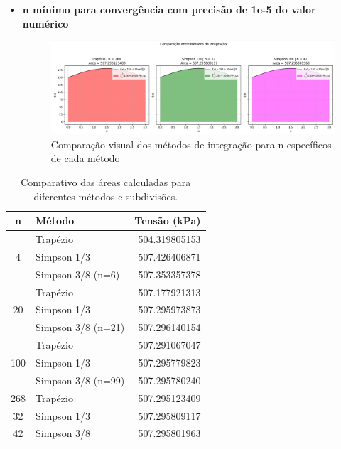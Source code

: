 \documentclass{article}
\begin{document}
\begin{itemize}
    \item \textbf{n mínimo para convergência com precisão de 1e-5 do valor numérico}
    \begin{figure}[H]
        \centering
        \includegraphics[width=1\textwidth, height=0.3\textheight, keepaspectratio]{n_min.png}
        \caption{Comparação visual dos métodos de integração para n específicos de cada método}\label{fig:n_min}
    \end{figure}
\end{itemize}

\begin{table}[htbp]
    \centering
    \caption{Comparativo das áreas calculadas para diferentes métodos e subdivisões.}\label{tab:resultados_agrupados}
    \begin{tabular}{c l r}
        \toprule
        \textbf{n} & \textbf{Método} & \textbf{ Tensão (kPa) } \\
        \midrule
        \multirow{3}{*}{4} 
        & Trapézio & 504.319805153 \\
        & Simpson 1/3 & 507.426406871 \\
        & Simpson 3/8 (n=6) & 507.353357378 \\
        \midrule
        \multirow{3}{*}{20} 
        & Trapézio & 507.177921313 \\
        & Simpson 1/3 & 507.295973873 \\
        & Simpson 3/8 (n=21) & 507.296140154 \\
        \midrule
        \multirow{3}{*}{100} 
        & Trapézio & 507.291067047 \\
        & Simpson 1/3 & 507.295779823 \\
        & Simpson 3/8 (n=99) & 507.295780240 \\
        \midrule
        268 & Trapézio & 507.295123409 \\
        32 & Simpson 1/3 & 507.295809117 \\
        42 & Simpson 3/8 & 507.295801963 \\
        \bottomrule


    \end{tabular}
\end{table}
\vspace{2cm}
\end{document}
